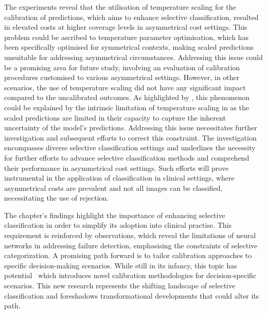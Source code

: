 The experiments reveal that the utilisation of temperature scaling for the calibration of predictions, which aims to enhance selective classification, resulted in elevated costs at higher coverage levels in asymmetrical cost settings. This problem could be ascribed to temperature parameter optimisation, which has been specifically optimised for symmetrical contexts, making scaled predictions unsuitable for addressing asymmetrical circumstances. Addressing this issue could be a promising area for future study, involving an evaluation of calibration procedures customised to various asymmetrical settings. However, in other scenarios, the use of temperature scaling did not have any significant impact compared to the uncalibrated outcomes. As highlighted by \cite{jaeger2022call}, this phenomenon could be explained by the intrinsic limitation of temperature scaling in as the scaled predictions are limited in their capacity to capture the inherent uncertainty of the model's predictions. Addressing this issue necessitates further investigation and subsequent efforts to correct this constraint. The investigation encompasses diverse selective classification settings and underlines the necessity for further efforts to advance selective classification methods and comprehend their performance in asymmetrical cost settings. Such efforts will prove instrumental in the application of classification in clinical settings, where asymmetrical costs are prevalent and not all images can be classified, necessitating the use of rejection.

The chapter's findings highlight the importance of enhancing selective classification in order to simplify its adoption into clinical practise. This requirement is reinforced by \cite{jaeger2022call} observations, which reveal the limitations of neural networks in addressing failure detection, emphasising the constraints of selective categorization. A promising path forward is to tailor calibration approaches to specific decision-making scenarios. While still in its infancy, this topic has potential~\citep{zhao2021calibrating} which introduces novel calibration methodologies for decision-specific scenarios. This new research represents the shifting landscape of selective classification and foreshadows transformational developments that could alter its path.